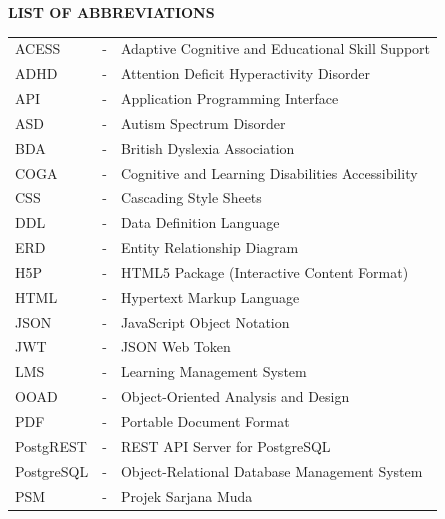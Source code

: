 \documentclass[12pt, oneside]{article} %
\newcommand{\tabbreak}{\hyphenpenalty=200\exhyphenpenalty=200\tolerance=4000\hbadness=10000\hspace{0pt}}
\begin{document}
\vfill \null 
{}
{}
{%
\let\oldnumberline\numberline%
\renewcommand{\numberline}{\tablename~\oldnumberline}%
\raggedright%
\listoftables%
}
\newpage

\vfill \null
{}
{}
{%
\let\oldnumberline\numberline%
\renewcommand{\numberline}{\figurename~\oldnumberline}%
\listoffigures%
}
\newpage

\vfill \null
{}
{}
\begin{center}
\textbf{LIST OF ABBREVIATIONS}
\end{center}
\vspace{2cm}

\noindent
\begin{tabular}{>{\raggedright\arraybackslash\tabbreak}p{2.27cm} >{\centering\arraybackslash\tabbreak}m{0.45cm} >{\raggedright\arraybackslash\tabbreak}p{11.0cm}}
ACESS & - & Adaptive Cognitive and Educational Skill Support \\
ADHD & - & Attention Deficit Hyperactivity Disorder \\
API & - & Application Programming Interface \\
ASD & - & Autism Spectrum Disorder \\
BDA & - & British Dyslexia Association \\
COGA & - & Cognitive and Learning Disabilities Accessibility \\
CSS & - & Cascading Style Sheets \\
DDL & - & Data Definition Language \\
ERD & - & Entity Relationship Diagram \\
H5P & - & HTML5 Package (Interactive Content Format) \\
HTML & - & Hypertext Markup Language \\
JSON & - & JavaScript Object Notation \\
JWT & - & JSON Web Token \\
LMS & - & Learning Management System \\
OOAD & - & Object-Oriented Analysis and Design \\
PDF & - & Portable Document Format \\
PostgREST & - & REST API Server for PostgreSQL \\
PostgreSQL & - & Object-Relational Database Management System \\
PSM & - & Projek Sarjana Muda \\

\end{tabular}
\end{document}
